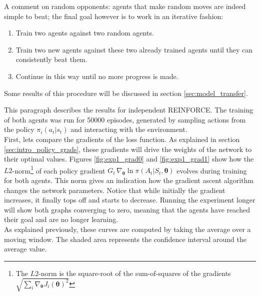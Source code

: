 A comment on random opponents: agents that make random moves are indeed simple to beat; the final goal however is to work in an iterative fashion: 
\begin{enumerate}
    \item Train two agents against two random agents.
    \item Train two new agents against these two already trained agents until they can consistently beat them.
    \item Continue in this way until no more progress is made.
\end{enumerate}
Some results of this procedure will be discussed in section \ref{sec:model_transfer}.

This paragraph describes the results for independent REINFORCE. The training of both agents was run for 50000 episodes, generated by sampling actions from the policy $\pi_i(a_t|s_t)$ and interacting with the environment.\\
First, lets compare the gradients of the loss function. As explained in section \ref{sec:intro_policy_grads}, these gradients will drive the weights of the network to their optimal values. Figures \ref{fig:exp1_grad0} and \ref{fig:exp1_grad1} show how the $L2$-norm\footnote{The $L2$-norm is the square-root of the sum-of-squares of the gradients $\sqrt{\sum_i \nabla_{\bm{\theta}} J_{i}(\bm{\theta})^2}$}  of each policy gradient $G_t \, \nabla_{\bm{\theta}} \ln \pi(A_t|S_t,\bm{\theta})$ evolves during training for both agents. This norm gives an indication how the gradient ascent algorithm changes the network parameters. Notice that while initially the gradient increases, it finally tops off and starts to decrease. Running the experiment longer will show both graphs converging to zero, meaning that the agents have reached their goal and are no longer learning.\\
As explained previously, these curves are computed by taking the average over a moving window. The shaded area represents the confidence interval around the average value.
